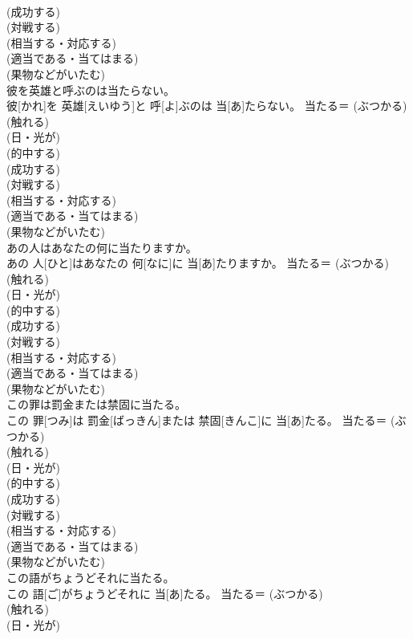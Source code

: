 \documentclass[8pt]{extreport}
\begin{document}
\begin{CJK}{UTF8}{min}
{\\	(成功する) 
\\	(対戦する) 
\\	(相当する・対応する) 
\\	(適当である・当てはまる) 
\\	(果物などがいたむ)
\\	彼を英雄と呼ぶのは当たらない。	
\\	彼[かれ]を 英雄[えいゆう]と 呼[よ]ぶのは 当[あ]たらない。	当たる＝ (ぶつかる) 
\\	(触れる) 
\\	(日・光が) 
\\	(的中する) 
\\	(成功する) 
\\	(対戦する) 
\\	(相当する・対応する) 
\\	(適当である・当てはまる) 
\\	(果物などがいたむ)
\\	あの人はあなたの何に当たりますか。	
\\	あの 人[ひと]はあなたの 何[なに]に 当[あ]たりますか。	当たる＝ (ぶつかる) 
\\	(触れる) 
\\	(日・光が) 
\\	(的中する) 
\\	(成功する) 
\\	(対戦する) 
\\	(相当する・対応する) 
\\	(適当である・当てはまる) 
\\	(果物などがいたむ)
\\	この罪は罰金または禁固に当たる。	
\\	この 罪[つみ]は 罰金[ばっきん]または 禁固[きんこ]に 当[あ]たる。	当たる＝ (ぶつかる) 
\\	(触れる) 
\\	(日・光が) 
\\	(的中する) 
\\	(成功する) 
\\	(対戦する) 
\\	(相当する・対応する) 
\\	(適当である・当てはまる) 
\\	(果物などがいたむ)
\\	この語がちょうどそれに当たる。	
\\	この 語[ご]がちょうどそれに 当[あ]たる。	当たる＝ (ぶつかる) 
\\	(触れる) 
\\	(日・光が) 
}
\end{CJK}
\end{document}
